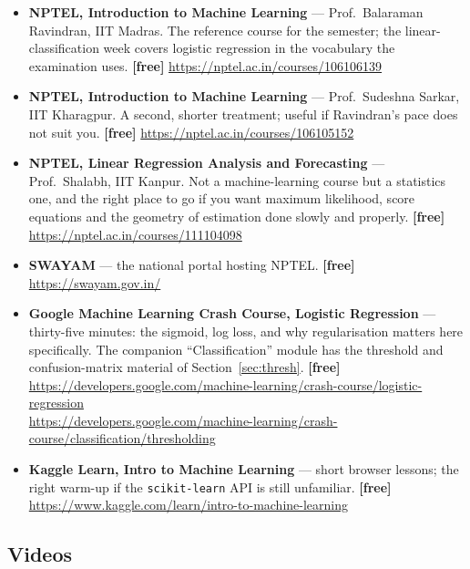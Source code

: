 \documentclass[11pt]{article}
\begin{document}
\begin{sloppypar}
\begin{itemize}[leftmargin=*]
  \item \textbf{NPTEL, Introduction to Machine Learning} --- Prof.\ Balaraman
    Ravindran, IIT Madras. The reference course for the semester; the
    linear-classification week covers logistic regression in the vocabulary
    the examination uses. \textbf{[free]}
    \url{https://nptel.ac.in/courses/106106139}
  \item \textbf{NPTEL, Introduction to Machine Learning} --- Prof.\ Sudeshna
    Sarkar, IIT Kharagpur. A second, shorter treatment; useful if
    Ravindran's pace does not suit you. \textbf{[free]}
    \url{https://nptel.ac.in/courses/106105152}
  \item \textbf{NPTEL, Linear Regression Analysis and Forecasting} ---
    Prof.\ Shalabh, IIT Kanpur. Not a machine-learning course but a
    statistics one, and the right place to go if you want maximum likelihood,
    score equations and the geometry of estimation done slowly and properly.
    \textbf{[free]} \url{https://nptel.ac.in/courses/111104098}
  \item \textbf{SWAYAM} --- the national portal hosting NPTEL. \textbf{[free]}
    \url{https://swayam.gov.in/}
  \item \textbf{Google Machine Learning Crash Course, Logistic Regression} ---
    thirty-five minutes: the sigmoid, log loss, and why regularisation matters
    here specifically. The companion ``Classification'' module has the
    threshold and confusion-matrix material of Section~\ref{sec:thresh}.
    \textbf{[free]}
    \url{https://developers.google.com/machine-learning/crash-course/logistic-regression}
    \\
    \url{https://developers.google.com/machine-learning/crash-course/classification/thresholding}
  \item \textbf{Kaggle Learn, Intro to Machine Learning} --- short browser
    lessons; the right warm-up if the \texttt{scikit-learn} API is still
    unfamiliar. \textbf{[free]}
    \url{https://www.kaggle.com/learn/intro-to-machine-learning}
\end{itemize}
\end{sloppypar}

\subsection*{Videos}
\end{document}
